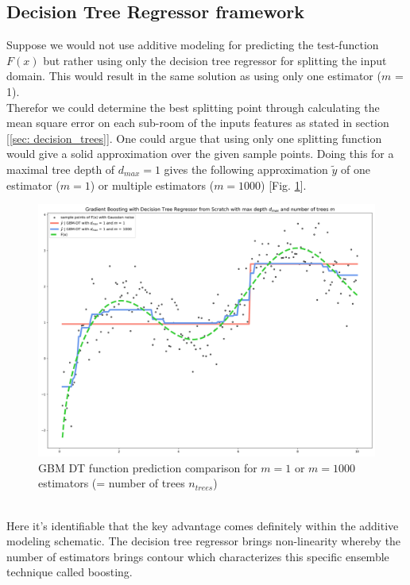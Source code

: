 \documentclass[12pt, a4paper]{article}
\begin{document}
\subsection{Decision Tree Regressor framework}
Suppose we would not use additive modeling for predicting the test-function $F(x)$ but rather using only the decision tree regressor for splitting the input domain. This would result in the same solution as using only one estimator ($m$ = 1). \\ 
Therefor we could determine the best splitting point through calculating the mean square error on each sub-room of the inputs features as stated in section [\ref{sec: decision_trees}]. One could argue that using only one splitting function would give a solid approximation over the given sample points. Doing this for a maximal tree depth of $d_{max} = 1$ gives the following approximation $\tilde{y}$ of one estimator ($m = 1$) or multiple estimators ($m = 1000$) [Fig. \ref{fig: gbm_dt_comparison}]. 
\begin{figure}[!htpb]
    \centering
    \includegraphics[width=1\textwidth,trim={0 0 0 0},clip]{figures/gbm_decision_tree_comparison.png}
    \caption[GBM-DT function prediction comparison over estimators]{GBM DT function prediction comparison for $m = 1$ or $m = 1000$ estimators (= number of trees $n_{trees}$)}
    \label{fig: gbm_dt_comparison}    
\end{figure}
\\
Here it's identifiable that the key advantage comes definitely within the additive modeling schematic. The decision tree regressor brings non-linearity whereby the number of estimators brings contour which characterizes this specific ensemble technique called boosting. \\
\end{document}
